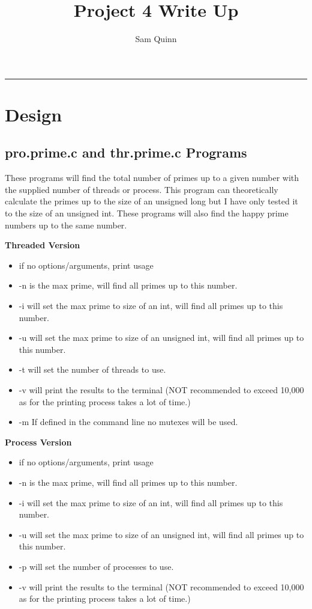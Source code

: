 \documentclass[letterpaper,10pt,notitlepage,fleqn]{article}
\title{Project 4 Write Up}
\author{Sam Quinn}
\begin{document}
\maketitle
\hrule

\section*{Design}

\subsection*{pro.prime.c and thr.prime.c Programs}
These programs will find the total number of primes up to a given number with the supplied number of threads or process. This program can theoretically calculate the primes up to the size of an unsigned long but I have only tested it to the size of an unsigned int. These programs will also find the happy prime numbers up to the same number.

\textbf{Threaded Version}
\begin{itemize} 
\item if no options/arguments, print usage
\item -n is the max prime, will find all primes up to this number.
\item -i will set the max prime to size of an int, will find all primes up to this number.
\item -u will set the max prime to size of an unsigned int, will find all primes up to this number.
\item -t will set the number of threads to use.
\item -v will print the results to the terminal (NOT recommended to exceed 10,000 as for the printing process takes a lot of time.)
\item -m If defined in the command line no mutexes will be used.
\end{itemize}

\textbf{ Process Version}
\begin{itemize} 
\item if no options/arguments, print usage
\item -n is the max prime, will find all primes up to this number.
\item -i will set the max prime to size of an int, will find all primes up to this number.
\item -u will set the max prime to size of an unsigned int, will find all primes up to this number.
\item -p will set the number of processes to use.
\item -v will print the results to the terminal (NOT recommended to exceed 10,000 as for the printing process takes a lot of time.)

\end{itemize}
\end{document}
